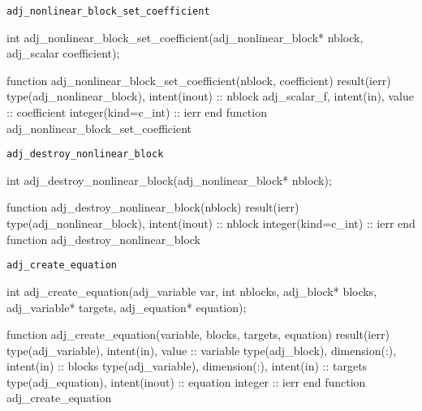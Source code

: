 \begin{boxwithtitle}{\texttt{adj_nonlinear_block_set_coefficient}}
\begin{minipage}{\columnwidth}
\begin{ccode}
  int adj_nonlinear_block_set_coefficient(adj_nonlinear_block* nblock, 
                                          adj_scalar coefficient);
\end{ccode}
\begin{fortrancode}
  function adj_nonlinear_block_set_coefficient(nblock, coefficient) result(ierr) 
    type(adj_nonlinear_block), intent(inout) :: nblock
    adj_scalar_f, intent(in), value :: coefficient
    integer(kind=c_int) :: ierr
  end function adj_nonlinear_block_set_coefficient
\end{fortrancode}
\end{minipage}
\end{boxwithtitle}


\begin{boxwithtitle}{\texttt{adj_destroy_nonlinear_block}}
\begin{minipage}{\columnwidth}
\begin{ccode}
  int adj_destroy_nonlinear_block(adj_nonlinear_block* nblock);
\end{ccode}
\begin{fortrancode}
  function adj_destroy_nonlinear_block(nblock) result(ierr)
    type(adj_nonlinear_block), intent(inout) :: nblock
    integer(kind=c_int) :: ierr
  end function adj_destroy_nonlinear_block
\end{fortrancode}
\end{minipage}
\end{boxwithtitle}


\begin{boxwithtitle}{\texttt{adj_create_equation}}
\begin{minipage}{\columnwidth}
\begin{ccode}
  int adj_create_equation(adj_variable var, int nblocks, adj_block* blocks, 
                          adj_variable* targets, adj_equation* equation);
\end{ccode}
\begin{fortrancode}
  function adj_create_equation(variable, blocks, targets, equation) result(ierr)
    type(adj_variable), intent(in), value :: variable
    type(adj_block), dimension(:), intent(in) :: blocks
    type(adj_variable), dimension(:), intent(in) :: targets
    type(adj_equation), intent(inout) :: equation
    integer :: ierr
  end function adj_create_equation
\end{fortrancode}
\end{minipage}
\end{boxwithtitle}


